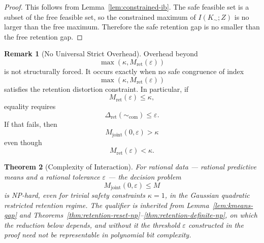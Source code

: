 \documentclass[12pt]{article}
\newtheorem{theorem}{Theorem}[section]
\theoremstyle{definition}
\newtheorem{remark}[theorem]{Remark}
\begin{document}
\begin{proof}
This follows from Lemma~\ref{lem:constrained-ib}.  The safe feasible set is a
subset of the free feasible set, so the constrained maximum of $I(K_\sim;Z)$
is no larger than the free maximum.  Therefore the safe retention gap is no
smaller than the free retention gap.
\end{proof}

\begin{remark}[No Universal Strict Overhead]
\label{rem:no-universal-overhead}
Overhead beyond
\[
\max(\kappa,M_{\mathrm{ret}}(\varepsilon))
\]
is not structurally forced.  It occurs exactly when no safe congruence of index
\[
\max(\kappa,M_{\mathrm{ret}}(\varepsilon))
\]
satisfies the retention distortion constraint.  In particular, if
\[
M_{\mathrm{ret}}(\varepsilon)\le\kappa,
\]
equality requires
\[
\Delta_{\mathrm{ret}}(\sim_{\mathrm{com}})\le\varepsilon.
\]
If that fails, then
\[
M_{\mathrm{joint}}(0,\varepsilon)>\kappa
\]
even though
\[
M_{\mathrm{ret}}(\varepsilon)<\kappa.
\]
\end{remark}

\begin{theorem}[Complexity of Interaction]
\label{thm:interaction-complexity}
For rational data --- rational predictive means and a rational tolerance
$\varepsilon$ --- the decision problem
\[
M_{\mathrm{joint}}(0,\varepsilon)\le M
\]
is NP-hard, even for trivial safety constraints $\kappa=1$, in the Gaussian
quadratic restricted retention regime.  The qualifier is inherited from
Lemma~\ref{lem:kmeans-gap} and
Theorems~\ref{thm:retention-reset-np}--\ref{thm:retention-definite-np}, on
which the reduction below depends, and without it the threshold
$\varepsilon$ constructed in the proof need not be representable in polynomial
bit complexity.
\end{theorem}
\end{document}
